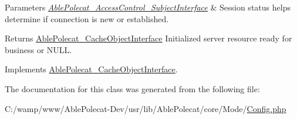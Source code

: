 \begin{DoxyParams}{Parameters}
{\em \hyperlink{interface_able_polecat___access_control___subject_interface}{Able\+Polecat\+\_\+\+Access\+Control\+\_\+\+Subject\+Interface}} & Session status helps determine if connection is new or established.\\
\hline
\end{DoxyParams}
\begin{DoxyReturn}{Returns}
\hyperlink{interface_able_polecat___cache_object_interface}{Able\+Polecat\+\_\+\+Cache\+Object\+Interface} Initialized server resource ready for business or N\+U\+L\+L. 
\end{DoxyReturn}


Implements \hyperlink{interface_able_polecat___cache_object_interface_a3f2135f6ad45f51d075657f6d20db2cd}{Able\+Polecat\+\_\+\+Cache\+Object\+Interface}.



The documentation for this class was generated from the following file\+:\begin{DoxyCompactItemize}
\item 
C\+:/wamp/www/\+Able\+Polecat-\/\+Dev/usr/lib/\+Able\+Polecat/core/\+Mode/\hyperlink{_config_8php}{Config.\+php}\end{DoxyCompactItemize}
